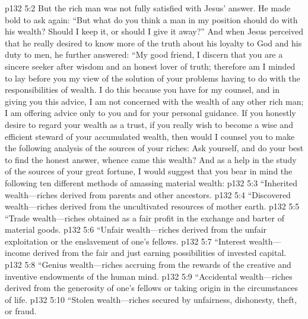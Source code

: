 \vs p132 5:2 But the rich man was not fully satisfied with Jesus’ answer. He made bold to ask again: “But what do you think a man in my position should do with his wealth? Should I keep it, or should I give it away?” And when Jesus perceived that he really desired to know more of the truth about his loyalty to God and his duty to men, he further answered: \textcolor{ubdarkred}{“My good friend, I discern that you are a sincere seeker after wisdom and an honest lover of truth; therefore am I minded to lay before you my view of the solution of your problems having to do with the responsibilities of wealth. I do this because you have  for my counsel, and in giving you this advice, I am not concerned with the wealth of any other rich man; I am offering advice only to you and for your personal guidance. If you honestly desire to regard your wealth as a trust, if you really wish to become a wise and efficient steward of your accumulated wealth, then would I counsel you to make the following analysis of the sources of your riches: Ask yourself, and do your best to find the honest answer, whence came this wealth? And as a help in the study of the sources of your great fortune, I would suggest that you bear in mind the following ten different methods of amassing material wealth:}
\pc \vs p132 5:3 \textcolor{ubdarkred}{“\bibnobreakspace Inherited wealth---riches derived from parents and other ancestors.}
\vs p132 5:4 \textcolor{ubdarkred}{“\bibnobreakspace Discovered wealth---riches derived from the uncultivated resources of mother earth.}
\vs p132 5:5 \textcolor{ubdarkred}{“\bibnobreakspace Trade wealth---riches obtained as a fair profit in the exchange and barter of material goods.}
\vs p132 5:6 \textcolor{ubdarkred}{“\bibnobreakspace Unfair wealth---riches derived from the unfair exploitation or the enslavement of one’s fellows.}
\vs p132 5:7 \textcolor{ubdarkred}{“\bibnobreakspace Interest wealth---income derived from the fair and just earning possibilities of invested capital.}
\vs p132 5:8 \textcolor{ubdarkred}{“\bibnobreakspace Genius wealth---riches accruing from the rewards of the creative and inventive endowments of the human mind.}
\vs p132 5:9 \textcolor{ubdarkred}{“\bibnobreakspace Accidental wealth---riches derived from the generosity of one’s fellows or taking origin in the circumstances of life.}
\vs p132 5:10 \textcolor{ubdarkred}{“\bibnobreakspace Stolen wealth---riches secured by unfairness, dishonesty, theft, or fraud.}
